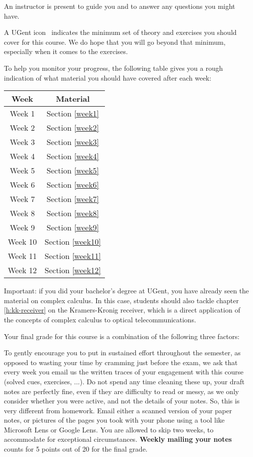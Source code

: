 An instructor is present to guide you and to answer any questions you might have.

A UGent icon \iconoffset\ugent\, indicates the minimum set of theory and exercises you should cover for this course. We do hope that you will go beyond that minimum, especially when it comes to the exercises.

To help you monitor your progress, the following table gives you a rough indication of what material you should have covered after each week:

\begin{center}
\begin{tabular}{ |c|c| } 
 \hline
  \textbf{Week} & \textbf{Material} \\
  \hline
 Week 1 & Section \ref{week1} \\ 
 Week 2 & Section \ref{week2} \\
 Week 3 & Section \ref{week3} \\
 Week 4 & Section \ref{week4} \\
 Week 5 & Section \ref{week5} \\
 Week 6 & Section \ref{week6} \\ 
 Week 7 & Section \ref{week7} \\
 Week 8 & Section \ref{week8} \\
 Week 9 & Section \ref{week9} \\
 Week 10 & Section \ref{week10}  \\
 Week 11 & Section \ref{week11} \\ 
 Week 12 & Section \ref{week12} \\
 \hline
\end{tabular}
\end{center}

Important: if you did your bachelor's degree at UGent, you have already seen the material on complex calculus. In this case, students should also tackle chapter \ref{h:kk-receiver} on the Kramers-Kronig receiver, which is a direct application of the concepts of complex calculus to optical telecommunications.

Your final grade for this course is a combination of the following three factors:

To gently encourage you to put in sustained effort throughout the semester, as opposed to wasting your time by cramming just before the exam, we ask that every week you email us the written traces of your engagement with this course (solved cues, exercises, ...). Do not spend any time cleaning these up, your draft notes are perfectly fine, even if they are difficulty to read or messy, as we only consider whether you were active, and not the details of your notes. So, this is very different from homework. Email either a scanned version of your paper notes, or pictures of the pages you took with your phone using a tool like Microsoft Lens or Google Lens. You are allowed to skip two weeks, to accommodate for exceptional circumstances. \textbf{Weekly mailing your notes} counts for 5 points out of 20 for the final grade.

